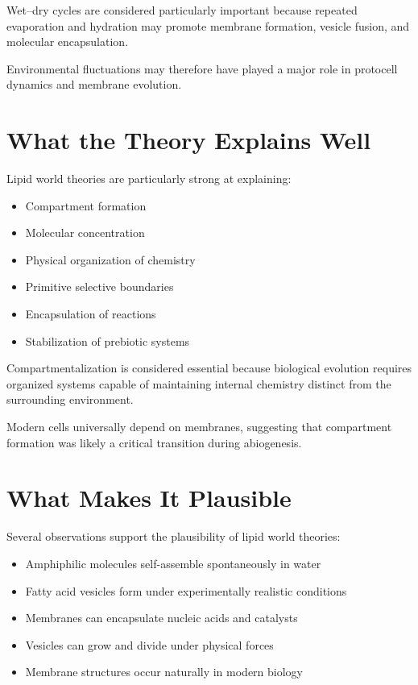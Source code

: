 \documentclass[
  oneside]{book}
\providecommand{\tightlist}{%
  \setlength{\itemsep}{0pt}\setlength{\parskip}{0pt}}
\begin{document}
Wet--dry cycles are considered particularly important because repeated evaporation and hydration may promote membrane formation, vesicle fusion, and molecular encapsulation.

Environmental fluctuations may therefore have played a major role in protocell dynamics and membrane evolution.

\section{What the Theory Explains Well}\label{what-the-theory-explains-well-3}

Lipid world theories are particularly strong at explaining:

\begin{itemize}
\tightlist
\item
  Compartment formation
\item
  Molecular concentration
\item
  Physical organization of chemistry
\item
  Primitive selective boundaries
\item
  Encapsulation of reactions
\item
  Stabilization of prebiotic systems
\end{itemize}

Compartmentalization is considered essential because biological evolution requires organized systems capable of maintaining internal chemistry distinct from the surrounding environment.

Modern cells universally depend on membranes, suggesting that compartment formation was likely a critical transition during abiogenesis.

\section{What Makes It Plausible}\label{what-makes-it-plausible-3}

Several observations support the plausibility of lipid world theories:

\begin{itemize}
\tightlist
\item
  Amphiphilic molecules self-assemble spontaneously in water
\item
  Fatty acid vesicles form under experimentally realistic conditions
\item
  Membranes can encapsulate nucleic acids and catalysts
\item
  Vesicles can grow and divide under physical forces
\item
  Membrane structures occur naturally in modern biology
\end{itemize}
\end{document}
